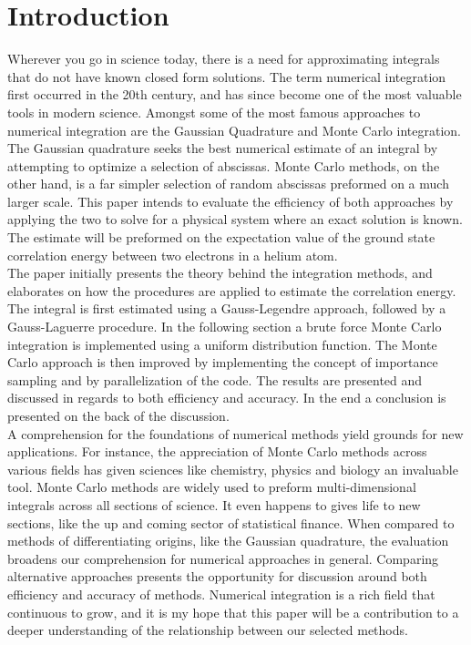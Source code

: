 \documentclass[%
reprint,
amsmath,amssymb,
aps,
]{revtex4-1}
\begin{document}
\section{Introduction}
\vspace{5mm}
\twocolumngrid \noindent
Wherever you go in science today, there is a need for approximating integrals that do not have known closed form solutions. The term numerical integration first occurred in the 20th century, and has since become one of the most valuable tools in modern science. Amongst some of the most famous approaches to numerical integration are the Gaussian Quadrature and Monte Carlo integration. The Gaussian quadrature seeks the best numerical estimate of an integral by attempting to optimize a selection of abscissas. Monte Carlo methods, on the other hand, is a far simpler selection of random abscissas preformed on a much larger scale. This paper intends to evaluate the efficiency of both approaches by applying the two to solve for a physical system where an exact solution is known. The estimate will be preformed on the expectation value of the ground state correlation energy between two electrons in a helium atom. \\
\indent The paper initially presents the theory behind the integration methods, and elaborates on how the procedures are applied to estimate the correlation energy. The integral is first estimated using a Gauss-Legendre approach, followed by a Gauss-Laguerre procedure. In the following section a brute force Monte Carlo integration is implemented using a uniform distribution function. The Monte Carlo approach is then improved by implementing the concept of importance sampling and by parallelization of the code. The results are presented and discussed in regards to both efficiency and accuracy. In the end a conclusion is presented on the back of the discussion. \\ \indent 
A comprehension for the foundations of numerical methods yield grounds for new applications. For instance, the appreciation of Monte Carlo methods across various fields has given sciences like chemistry, physics and biology an invaluable tool. Monte Carlo methods are widely used to preform  multi-dimensional integrals across all sections of science. It even happens to gives life to new sections, like the up and coming sector of statistical finance. When compared to methods of differentiating origins, like the Gaussian quadrature, the evaluation broadens our comprehension for numerical approaches in general. Comparing alternative approaches presents the  opportunity for discussion around both efficiency and accuracy of methods. Numerical integration is a rich field that continuous to grow, and it is my hope that this paper will be a contribution to a deeper understanding of the relationship between our selected methods. \newpage 
 
\end{document}
